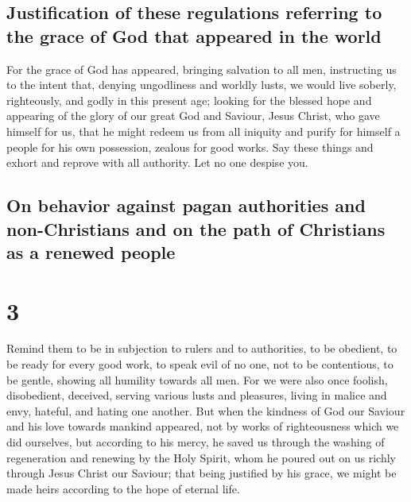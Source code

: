 \hypertarget{justification-of-these-regulations-referring-to-the-grace-of-god-that-appeared-in-the-world}{%
\subsection{Justification of these regulations referring to the grace of
God that appeared in the
world}\label{justification-of-these-regulations-referring-to-the-grace-of-god-that-appeared-in-the-world}}

 For the grace of God has appeared, bringing salvation to
all men,  instructing us to the intent that, denying
ungodliness and worldly lusts, we would live soberly, righteously, and
godly in this present age;  looking for the blessed hope
and appearing of the glory of our great God and Saviour, Jesus Christ,
 who gave himself for us, that he might redeem us from
all iniquity and purify for himself a people for his own possession,
zealous for good works.  Say these things and exhort and
reprove with all authority. Let no one despise you.

\hypertarget{on-behavior-against-pagan-authorities-and-non-christians-and-on-the-path-of-christians-as-a-renewed-people}{%
\subsection{On behavior against pagan authorities and non-Christians and
on the path of Christians as a renewed
people}\label{on-behavior-against-pagan-authorities-and-non-christians-and-on-the-path-of-christians-as-a-renewed-people}}

\hypertarget{section-2}{%
\section{3}\label{section-2}}

 Remind them to be in subjection to rulers and to
authorities, to be obedient, to be ready for every good work,
 to speak evil of no one, not to be contentious, to be
gentle, showing all humility towards all men.  For we were
also once foolish, disobedient, deceived, serving various lusts and
pleasures, living in malice and envy, hateful, and hating one another.
 But when the kindness of God our Saviour and his love
towards mankind appeared,  not by works of righteousness
which we did ourselves, but according to his mercy, he saved us through
the washing of regeneration and renewing by the Holy Spirit,
 whom he poured out on us richly through Jesus Christ our
Saviour;  that being justified by his grace, we might be
made heirs according to the hope of eternal life.

